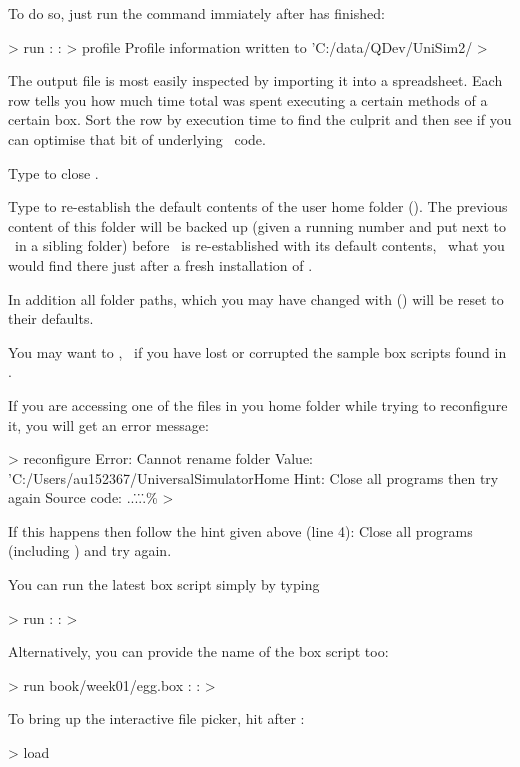 To do so, just run the  command immiately after  has finished:

\lstset{numbers=left}
\begin{usdialog}
> run
:
:
> profile
Profile information written to 'C:/data/QDev/UniSim2/%
> 
\end{usdialog}
\lstset{numbers=none}

The output file is most easily inspected by importing it into a spreadsheet. Each row tells you how much time total was spent executing a certain methods of a certain box. Sort the row by execution time to find the culprit and then see if you can optimise that bit of underlying \CPP\ code.
                

Type  to close \US.
                            

Type  to re-establish the default contents of the user home folder (\ushome). The previous content of this folder will be backed up (given a running number and put next to \ushome\ in a sibling folder) before \ushome\ is re-established with its default contents, \ie\ what you would find there just after a fresh installation of \US. 

In addition all folder paths, which you may have changed with  () will be reset to their defaults.

You may want to , \eg\ if you have lost or corrupted the sample box scripts found in .

If you are accessing one of the files in you home folder while trying to reconfigure it, you will get an error message:
\lstset{numbers=left}
\begin{userror}
> reconfigure
Error: Cannot rename folder
Value: 'C:/Users/au152367/UniversalSimulatorHome %
Hint: Close all programs then try again
Source code: ..\..\..\..\src\plugins\base\%\brk%
>
\end{userror}
\lstset{numbers=none}
If this happens then follow the hint given above (line 4): Close all programs (including \US) and try again.


You can run the latest box script simply by typing
\begin{usdialog}
> run
:
:
>
\end{usdialog}
Alternatively, you can provide the name of the box script too:
\begin{usdialog}
> run book/week01/egg.box
:
:
>
\end{usdialog}
To bring up the interactive file picker, hit  after :
\begin{usdialog}
> load %
\end{usdialog}


